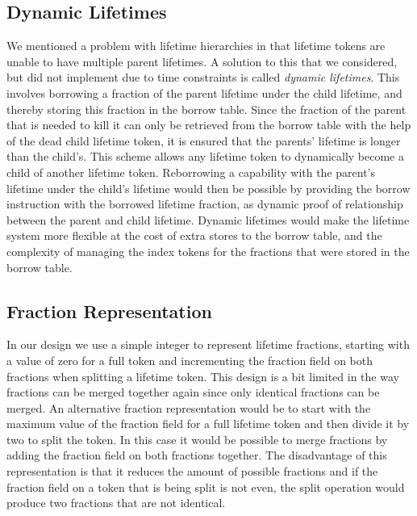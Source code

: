 \subsection{Dynamic Lifetimes}
\label{sec:dynamiclifetimes}
We mentioned a problem with lifetime hierarchies in that lifetime tokens are unable to have multiple parent lifetimes.
A solution to this that we considered, but did not implement due to time constraints is called \textit{dynamic lifetimes}.
This involves borrowing a fraction of the parent lifetime under the child lifetime, and thereby storing this fraction in the borrow table.
Since the fraction of the parent that is needed to kill it can only be retrieved from the borrow table with the help of the dead child lifetime token, it is ensured that the parents' lifetime is longer than the child's.
This scheme allows any lifetime token to dynamically become a child of another lifetime token.
Reborrowing a capability with the parent's lifetime under the child's lifetime would then be possible by providing the borrow instruction with the borrowed lifetime fraction, as dynamic proof of relationship between the parent and child lifetime.
Dynamic lifetimes would make the lifetime system more flexible at the cost of extra stores to the borrow table, and the complexity of managing the index tokens for the fractions that were stored in the borrow table.

\subsection{Fraction Representation}
In our design we use a simple integer to represent lifetime fractions, starting with a value of zero for a full token and incrementing the fraction field on both fractions when splitting a lifetime token.
This design is a bit limited in the way fractions can be merged together again since only identical fractions can be merged.
An alternative fraction representation would be to start with the maximum value of the fraction field for a full lifetime token and then divide it by two to split the token.
In this case it would be possible to merge fractions by adding the fraction field on both fractions together.
The disadvantage of this representation is that it reduces the amount of possible fractions and if the fraction field on a token that is being split is not even, the split operation would produce two fractions that are not identical.

